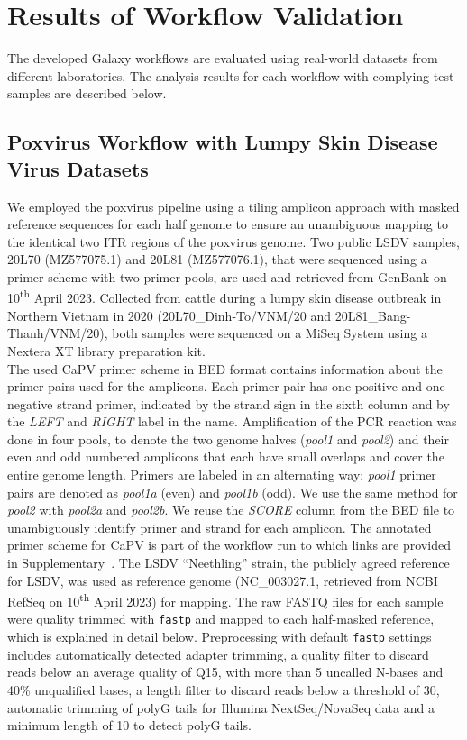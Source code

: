 \chapter{Results of Workflow Validation}\label{chap:results}
The developed Galaxy workflows are evaluated using real-world datasets from different laboratories. The analysis results for each workflow with complying test samples are described below.

\section{Poxvirus Workflow with Lumpy Skin Disease Virus Datasets}
We employed the poxvirus pipeline using a tiling amplicon approach with masked reference sequences for each half genome to ensure an unambiguous mapping to the identical two \ac{ITR} regions of the poxvirus genome. Two public \ac{LSDV} samples, 20L70 (MZ577075.1) and 20L81 (MZ577076.1), that were sequenced using a primer scheme with two primer pools, are used and retrieved from GenBank on 10\textsuperscript{th} April 2023. Collected from cattle  during a lumpy skin disease outbreak in Northern Vietnam in 2020 (20L70\_Dinh-To/VNM/20 and 20L81\_Bang-Thanh/VNM/20), both samples were sequenced on a MiSeq System using a Nextera XT library preparation kit. \\
The used \acs{CaPV} primer scheme in \ac{BED} format contains information about the primer pairs used for the amplicons. Each primer pair has one positive and one negative strand primer, indicated by the strand sign in the sixth column and by the \textit{LEFT} and \textit{RIGHT} label in the name. Amplification of the \ac{PCR} reaction was done in four pools, to denote the two genome halves (\textit{pool1} and \textit{pool2}) and their even and odd numbered amplicons that each have small overlaps and cover the entire genome length. Primers are labeled in an alternating way: \textit{pool1} primer pairs are denoted as \textit{pool1a} (even) and \textit{pool1b} (odd). We use the same method for \textit{pool2} with \textit{pool2a} and \textit{pool2b}. We reuse the \textit{SCORE} column from the \ac{BED} file to unambiguously identify primer and strand for each amplicon. The annotated primer scheme for \ac{CaPV} is part of the workflow run to which links are provided in Supplementary~. The \ac{LSDV} ``Neethling'' strain, the publicly agreed reference for \ac{LSDV}, was used as reference genome (NC\_003027.1, retrieved from \ac{NCBI} RefSeq on 10\textsuperscript{th} April 2023) for mapping. The raw FASTQ files for each sample were quality trimmed with \texttt{fastp} and mapped to each half-masked reference, which is explained in detail below. Preprocessing with default \texttt{fastp} settings includes automatically detected adapter trimming, a quality filter to discard reads below an average quality of Q15, with more than 5 uncalled N-bases and 40\% unqualified bases, a length filter to discard reads below a threshold of 30, automatic trimming of polyG tails for Illumina NextSeq/NovaSeq data and a minimum length of 10 to detect polyG tails.
\\

